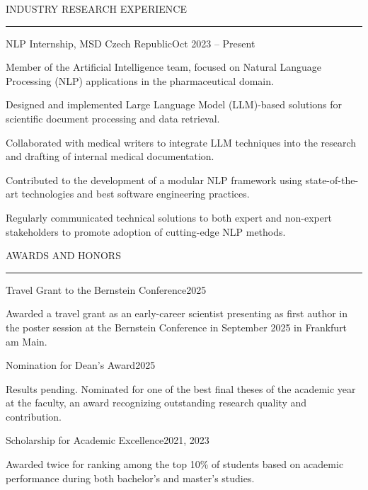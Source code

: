 \documentclass{resume} %
\renewenvironment{rSection}[1]{
\sectionskip
\textcolor{CarnegieMellonRed}{\MakeUppercase{#1}}
\sectionlineskip
\hrule
\begin{list}{}{
\setlength{\leftmargin}{1.5em}
}
\item[]
}{
\end{list}
}
\begin{document}

\begin{rSection}{Industry Research Experience}

\begin{rProject}{\large NLP Internship, MSD Czech Republic}{Oct 2023 -- Present}{}{}
    \item Member of the Artificial Intelligence team, focused on Natural Language Processing (NLP) applications in the pharmaceutical domain.
    \item Designed and implemented Large Language Model (LLM)-based solutions for scientific document processing and data retrieval.
    \item Collaborated with medical writers to integrate LLM techniques into the research and drafting of internal medical documentation.
    \item Contributed to the development of a modular NLP framework using state-of-the-art technologies and best software engineering practices.
    \item Regularly communicated technical solutions to both expert and non-expert stakeholders to promote adoption of cutting-edge NLP methods.
\end{rProject}

\end{rSection}


\begin{rSection}{Awards and Honors} \itemsep -2pt

\begin{rProject}{\large Travel Grant to the Bernstein Conference}{2025}{}{}
    \item Awarded a travel grant as an early-career scientist presenting as first author in the poster session at the Bernstein Conference in September 2025 in Frankfurt am Main.
\end{rProject}

\begin{rProject}{\large Nomination for Dean's Award}{2025}{}{}
    \item Results pending. Nominated for one of the best final theses of the academic year at the faculty, an award recognizing outstanding research quality and contribution.
\end{rProject}

\begin{rProject}{Scholarship for Academic Excellence}{2021, 2023}{}{}
    \item Awarded twice for ranking among the top 10\% of students based on academic performance during both bachelor's and master's studies.
\end{rProject}

\end{rSection}
\end{document}
